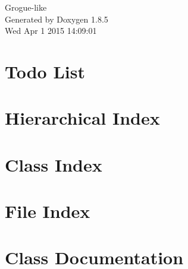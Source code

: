 \documentclass[twoside]{book}
\newcommand{\clearemptydoublepage}{%
  \newpage{\pagestyle{empty}\cleardoublepage}%
}
\begin{document}
\hypersetup{pageanchor=false}
\begin{titlepage}
\vspace*{7cm}
\begin{center}%
{\Large Grogue-\/like }\\
\vspace*{1cm}
{\large Generated by Doxygen 1.8.5}\\
\vspace*{0.5cm}
{\small Wed Apr 1 2015 14:09:01}\\
\end{center}
\end{titlepage}
\clearemptydoublepage
\tableofcontents
\clearemptydoublepage
{}
\hypersetup{pageanchor=true}

\chapter{Todo List}
\label{todo}
\hypertarget{todo}{}

\chapter{Hierarchical Index}

\chapter{Class Index}

\chapter{File Index}

\chapter{Class Documentation}






















\end{document}

